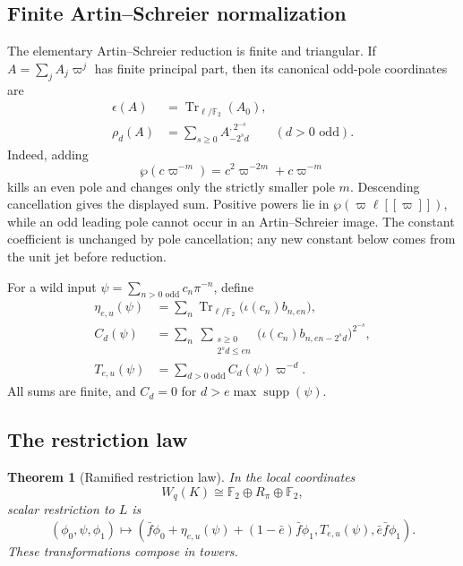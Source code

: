 \documentclass[11pt]{article}
\newtheorem{theorem}{Theorem}[section]
\theoremstyle{definition}
\theoremstyle{remark}
\newcommand{\F}{\mathbb{F}}
\newcommand{\Tr}{\operatorname{Tr}}
\begin{document}
\subsection{Finite Artin--Schreier normalization}

The elementary Artin--Schreier reduction is finite and triangular.  If
$A=\sum_jA_j\varpi^j$ has finite principal part, then its canonical odd-pole
coordinates are
\begin{align*}
 \epsilon(A)&=\Tr_{\ell/\F_2}(A_0),\\
 \rho_d(A)&=\sum_{s\ge0}A_{-2^sd}^{,2^{-s}}
       \qquad(d>0\text{ odd}).
\end{align*}
Indeed, adding
\[
\wp(c\varpi^{-m})=c^2\varpi^{-2m}+c\varpi^{-m}
\]
kills an even pole and changes only the strictly smaller pole $m$.  Descending
cancellation gives the displayed sum.  Positive powers lie in
$\wp(\varpi\ell[[\varpi]])$, while an odd leading pole cannot occur in an
Artin--Schreier image.  The constant coefficient is unchanged by pole
cancellation; any new constant below comes from the unit jet before reduction.

For a wild input
$\psi=\sum_{n>0\text{ odd}}c_n\pi^{-n}$, define
\begin{align*}
 \eta_{e,u}(\psi)
  &=\sum_n\Tr_{\ell/\F_2}
       \bigl(\iota(c_n)b_{n,en}\bigr),\\
 C_d(\psi)
  &=\sum_n\ \sum_{\substack{s\ge0\\2^sd\le en}}
       \bigl(\iota(c_n)b_{n,en-2^sd}\bigr)^{2^{-s}},\\
 T_{e,u}(\psi)&=\sum_{d>0\text{ odd}}C_d(\psi)\varpi^{-d}.
\end{align*}
All sums are finite, and $C_d=0$ for
$d>e\max\operatorname{supp}(\psi)$.

\subsection{The restriction law}

\begin{theorem}[Ramified restriction law]\label{thm:ramified}
In the local coordinates
\[
W_q(K)\cong\F_2\oplus R_\pi\oplus\F_2,
\]
scalar restriction to $L$ is
\[
(\phi_0,\psi,\phi_1)\longmapsto
\left(
 \bar f\phi_0+\eta_{e,u}(\psi)+(1-\bar e)\bar f\phi_1,
 T_{e,u}(\psi),
 \bar e\bar f\phi_1
\right).
\]
These transformations compose in towers.
\end{theorem}
\end{document}
